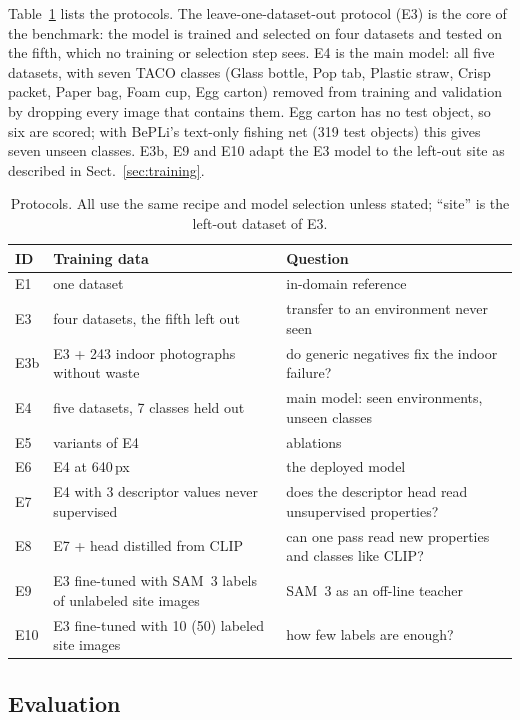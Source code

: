 \documentclass[pdflatex,sn-basic,Numbered]{sn-jnl}%
\begin{document}
Table~\ref{tab:protocols} lists the protocols. The leave-one-dataset-out protocol (E3) is the core of the benchmark: the model is trained and selected on four datasets and tested on the fifth, which no training or selection step sees. E4 is the main model: all five datasets, with seven TACO classes (Glass bottle, Pop tab, Plastic straw, Crisp packet, Paper bag, Foam cup, Egg carton) removed from training and validation by dropping every image that contains them. Egg carton has no test object, so six are scored; with BePLi's text-only fishing net (319 test objects) this gives seven unseen classes. E3b, E9 and E10 adapt the E3 model to the left-out site as described in Sect.~\ref{sec:training}.

\begin{table}[t]
\caption{Protocols. All use the same recipe and model selection unless stated; ``site'' is the left-out dataset of E3.}\label{tab:protocols}
\centering\footnotesize
\begin{tabular}{@{}l>{\raggedright\arraybackslash}p{4.6cm}>{\raggedright\arraybackslash}p{5.2cm}@{}}
\toprule
ID & Training data & Question\\
\midrule
E1 & one dataset & in-domain reference\\
E3 & four datasets, the fifth left out & transfer to an environment never seen\\
E3b & E3 + 243 indoor photographs without waste & do generic negatives fix the indoor failure?\\
E4 & five datasets, 7 classes held out & main model: seen environments, unseen classes\\
E5 & variants of E4 & ablations\\
E6 & E4 at 640\,px & the deployed model\\
E7 & E4 with 3 descriptor values never supervised & does the descriptor head read unsupervised properties?\\
E8 & E7 + head distilled from CLIP & can one pass read new properties and classes like CLIP?\\
E9 & E3 fine-tuned with SAM~3 labels of unlabeled site images & SAM~3 as an off-line teacher\\
E10 & E3 fine-tuned with 10 (50) labeled site images & how few labels are enough?\\
\bottomrule
\end{tabular}
\end{table}

\subsection{Evaluation}\label{sec:eval}
\end{document}

